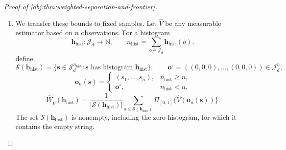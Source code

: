 \documentclass[11pt]{article}
\begin{document}
\begin{proof}[Proof of \cref{obj:thm:weighted-separation-and-frontier}]
\begin{enumerate}
If
\[
128\mathfrak a^2\le d\delta_{\mathrm{de}}^2,
\]
the target-deviation probability at radius
\(\delta_{\mathrm{de}}/4\) is at most \(1/8\). Applying the midpoint argument above to the two dense centers gives, for every measurable estimator of the full counts,
\[
\max_{\iota=0,1}\mathcal B_{\mathrm{de},\iota}(\widehat W)
\ge\frac{5\delta_{\mathrm{de}}^2}{256}
\ge\frac5{2560000}\frac{\mathfrak a^2}{K_{\mathrm{abs}}^2},
\]
where
\[
\mathcal B_{\mathrm{de},\iota}(\widehat W)
=
E_{\mathbf T^{\mathrm{de}}\sim\eta_\iota^{\otimes d}}
E_{\mathrm{counts}\mid\mathbf T^{\mathrm{de}}}
[\{\widehat W-\Psi_{\mathrm{de}}(\mathbf T^{\mathrm{de}})\}^2].
\]
Choose
\[
C_{\mathrm{de}}=\max\{C_{\mathrm{tv}},2\},
\qquad
K_{\mathrm{de}}=\mathcal K_{\mathrm{cal}}(C_{\mathrm{de}},d).
\]
The same logarithmic cutoff construction, applied with packet comparison constant \(1/100\), supplies a universal
\(D_{\mathrm{de}}\ge2\) such that
\[
1280000K_{\mathrm{de}}^2\le d
\quad(d\ge D_{\mathrm{de}}).
\]
Since
\(\delta_{\mathrm{de}}^2\ge\mathfrak a^2/(10000K_{\mathrm{de}}^2)\),
this implies the required target-deviation condition. Reordering the four counts into the observed atom histogram is a bijection, so both integrated-risk bounds hold on that histogram space.

\item
We transfer these bounds to fixed samples. Let \(\widehat V\) be any measurable estimator based on \(n\) observations. For a histogram
\[
\boldsymbol h_{\mathrm{hist}}:\mathcal J_d\to\mathbb N,
\qquad
n_{\mathrm{hist}}=\sum_{o\in\mathcal J_d}\boldsymbol h_{\mathrm{hist}}(o),
\]
define
\[
\mathcal S(\boldsymbol h_{\mathrm{hist}})
=\{\boldsymbol s\in\mathcal J_d^{n_{\mathrm{hist}}}:
\boldsymbol s\text{ has histogram }\boldsymbol h_{\mathrm{hist}}\},
\qquad
\boldsymbol o^\circ=((0,0,0),\ldots,(0,0,0))\in\mathcal J_d^n,
\]
\[
\boldsymbol o_n(\boldsymbol s)=
\begin{cases}
(s_1,\ldots,s_n),&n_{\mathrm{hist}}\ge n,\\
\boldsymbol o^\circ,&n_{\mathrm{hist}}<n,
\end{cases}
\]
\[
\widehat W_{\widehat V}(\boldsymbol h_{\mathrm{hist}})
=\frac1{|\mathcal S(\boldsymbol h_{\mathrm{hist}})|}
 \sum_{\boldsymbol s\in\mathcal S(\boldsymbol h_{\mathrm{hist}})}
 \Pi_{[0,1]}\{\widehat V(\boldsymbol o_n(\boldsymbol s))\}.
\]
The set \(\mathcal S(\boldsymbol h_{\mathrm{hist}})\) is nonempty, including the zero histogram, for which it contains the empty string.


\end{enumerate}
\end{proof}
\end{document}
